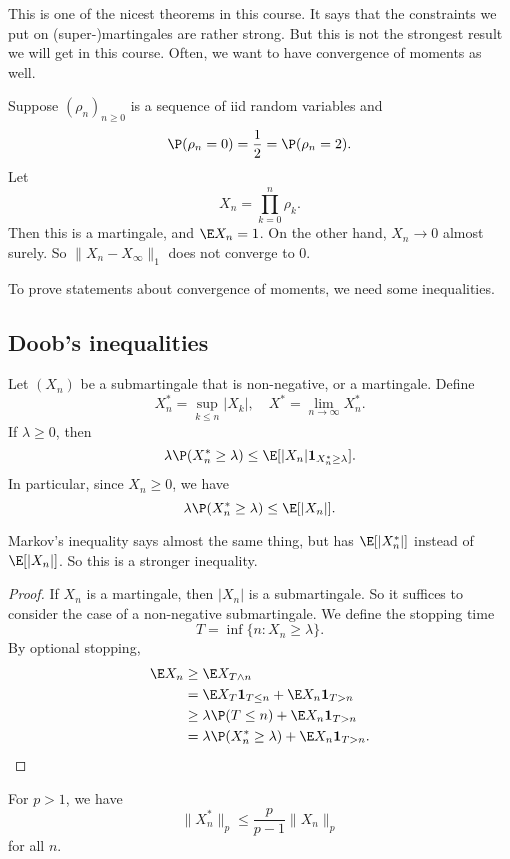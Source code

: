 \documentclass[a4paper]{article}
\begin{document}
This is one of the nicest theorems in this course. It says that the constraints we put on (super-)martingales are rather strong. But this is not the strongest result we will get in this course. Often, we want to have convergence of moments as well.

\begin{eg}
  Suppose $(\rho_n)_{n \geq 0}$ is a sequence of iid random variables and
  \[
    \P(\rho_n = 0) = \frac{1}{2} = \P(\rho_n = 2).
  \]
  Let
  \[
    X_n = \prod_{k = 0}^n \rho_k.
  \]
  Then this is a martingale, and $\E X_n = 1$. On the other hand, $X_n \to 0$ almost surely. So $\|X_n - X_\infty\|_1$ does not converge to $0$.
\end{eg}

To prove statements about convergence of moments, we need some inequalities.
\subsection{Doob's inequalities}
\begin{lemma}
  Let $(X_n)$ be a submartingale that is non-negative, or a martingale. Define
  \[
    X^*_n = \sup_{k \leq n} |X_k|,\quad X^* = \lim_{n \to \infty} X_n^*.
  \]
  If $\lambda \geq 0$, then
  \[
    \lambda \P(X_n^* \geq \lambda) \leq \E[|X_n|\mathbf{1}_{X_n^* \geq \lambda}].
  \]
  In particular, since $X_n \geq 0$, we have
  \[
    \lambda \P(X_n^* \geq \lambda) \leq \E[|X_n|].
  \]
\end{lemma}
Markov's inequality says almost the same thing, but has $\E[|X_n^*|]$ instead of $\E[|X_n|]$. So this is a stronger inequality.

\begin{proof}
  If $X_n$ is a martingale, then $|X_n|$ is a submartingale. So it suffices to consider the case of a non-negative submartingale. We define the stopping time
  \[
    T = \inf\{n: X_n \geq \lambda\}.
  \]
  By optional stopping,
  \begin{align*}
    \E X_n &\geq \E X_{T \wedge n} \\
    &= \E X_T \mathbf{1}_{T \leq n} + \E X_n \mathbf{1}_{T > n}\\
    &\geq \lambda \P(T \leq n) + \E X_n \mathbf{1}_{T > n}\\
    &= \lambda \P(X_n^* \geq \lambda) + \E X_n \mathbf{1}_{T > n}.
  \end{align*}
\end{proof}

\begin{lemma}[$L^p$ inequality]
  For $p > 1$, we have
  \[
    \|X_n^*\|_p \leq \frac{p}{p - 1} \|X_n\|_p
  \]
  for all $n$.
\end{lemma}
\end{document}
